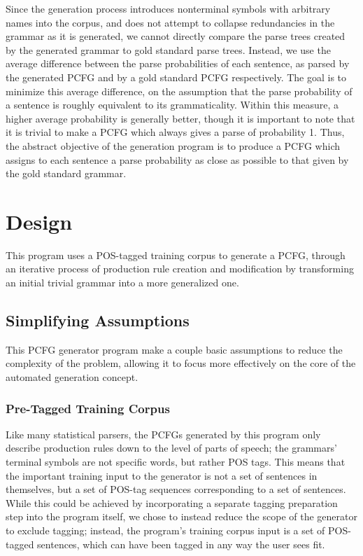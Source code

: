 \documentclass[paper=a4, fontsize=11pt]{scrartcl} %
\numberwithin{equation}{section} %
\numberwithin{figure}{section} %
\numberwithin{table}{section} %
\begin{document}
Since the generation process introduces nonterminal symbols with arbitrary names into the corpus, and does not attempt to collapse redundancies in the grammar as it is generated, we cannot directly compare the parse trees created by the generated grammar to gold standard parse trees. Instead, we use the average difference between the parse probabilities of each sentence, as parsed by the generated PCFG and by a gold standard PCFG respectively. The goal is to minimize this average difference, on the assumption that the parse probability of a sentence is roughly equivalent to its grammaticality. Within this measure, a higher average probability is generally better, though it is important to note that it is trivial to make a PCFG which always gives a parse of probability 1. Thus, the abstract objective of the generation program is to produce a PCFG which assigns to each sentence a parse probability as close as possible to that given by the gold standard grammar.



\section{Design}

This program uses a POS-tagged training corpus to generate a PCFG, through an iterative process of production rule creation and modification by transforming an initial trivial grammar into a more generalized one.

\subsection{Simplifying Assumptions}

This PCFG generator program make a couple basic assumptions to reduce the complexity of the problem, allowing it to focus more effectively on the core of the automated generation concept.

\subsubsection{Pre-Tagged Training Corpus}

Like many statistical parsers, the PCFGs generated by this program only describe production rules down to the level of parts of speech; the grammars' terminal symbols are not specific words, but rather POS tags. This means that the important training input to the generator is not a set of sentences in themselves, but a set of POS-tag sequences corresponding to a set of sentences. While this could be achieved by incorporating a separate tagging preparation step into the program itself, we chose to instead reduce the scope of the generator to exclude tagging; instead, the program's training corpus input is a set of POS-tagged sentences, which can have been tagged in any way the user sees fit.
\end{document}
